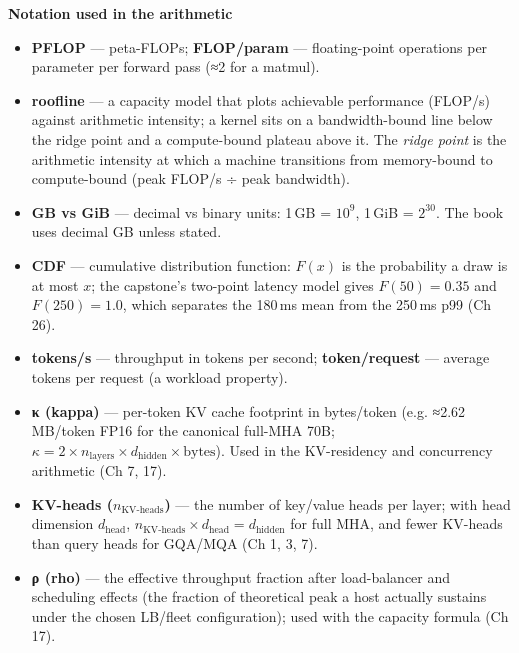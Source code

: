 \noindent\textbf{Notation used in the arithmetic}
\begin{itemize}\tightlist
\item \textbf{PFLOP} — peta-FLOPs; \textbf{FLOP/param} — floating-point operations per parameter per forward pass (≈2 for a matmul).
\item \textbf{roofline} — a capacity model that plots achievable performance (FLOP/s) against arithmetic intensity; a kernel sits on a bandwidth-bound line below the ridge point and a compute-bound plateau above it. The \emph{ridge point} is the arithmetic intensity at which a machine transitions from memory-bound to compute-bound (peak FLOP/s ÷ peak bandwidth).
\item \textbf{GB vs GiB} — decimal vs binary units: 1\,GB = $10^9$, 1\,GiB = $2^{30}$. The book uses decimal GB unless stated.
\item \textbf{CDF} — cumulative distribution function: $F(x)$ is the probability a draw is at most $x$; the capstone's two-point latency model gives $F(50)=0.35$ and $F(250)=1.0$, which separates the 180\,ms mean from the 250\,ms p99 (Ch 26).
\item \textbf{tokens/s} — throughput in tokens per second; \textbf{token/request} — average tokens per request (a workload property).
\item \textbf{κ (kappa)} — per-token KV cache footprint in bytes/token (e.g. ≈2.62 MB/token FP16 for the canonical full-MHA 70B; $\kappa = 2 \times n_\text{layers} \times d_\text{hidden} \times \text{bytes}$). Used in the KV-residency and concurrency arithmetic (Ch 7, 17).
\item \textbf{KV-heads ($n_{\text{KV-heads}}$)} — the number of key/value heads per layer; with head dimension $d_\text{head}$, $n_{\text{KV-heads}} \times d_\text{head} = d_\text{hidden}$ for full MHA, and fewer KV-heads than query heads for GQA/MQA (Ch 1, 3, 7).
\item \textbf{ρ (rho)} — the effective throughput fraction after load-balancer and scheduling effects (the fraction of theoretical peak a host actually sustains under the chosen LB/fleet configuration); used with the capacity formula (Ch 17).
\end{itemize}

